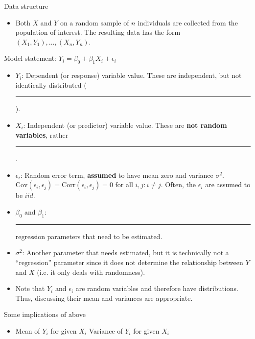 \documentclass{article}
\newcommand{\blankul}[1]{\rule[-1.5mm]{#1}{0.15mm}}	%
\begin{document}
\newpage

Data structure\bigskip
\begin{itemize}
    \item Both $X$ and $Y$ on a random sample of $n$ individuals are collected from the population of interest. The resulting data has the form $(X_1, Y_1), \ldots, (X_n, Y_n)$.
\end{itemize}\bigskip

Model statement: $Y_i = \beta_0 + \beta_1 X_i + \epsilon_i$\bigskip
\begin{itemize}
    \item $Y_i$: Dependent (or response) variable value. These are independent, but not identically distributed (\blankul{5cm}).
    \item $X_i$: Independent (or predictor) variable value. These are \textbf{not random variables}, rather \blankul{4cm}.
    \item $\epsilon_i$: Random error term, \textbf{assumed} to have mean zero and variance $\sigma^2$. \\$\mathrm{Cov}(\epsilon_i, \epsilon_j) = \mathrm{Corr}(\epsilon_i, \epsilon_j) = 0$ for all $i,j : i \ne j$. Often, the $\epsilon_i$ are assumed to be $iid$.
    \item $\beta_0$ and $\beta_1$: \blankul{5cm} regression parameters that need to be estimated.
    \item $\sigma^2$: Another parameter that needs estimated, but it is technically not a ``regression'' parameter since it does not determine the relationship between $Y$ and $X$ (i.e. it only deals with randomness).
    \item Note that $Y_i$ and $\epsilon_i$ are random variables and therefore have distributions. Thus, discussing their mean and variances are appropriate.
\end{itemize}\bigskip

Some implications of above\bigskip
\begin{itemize}
    \item Mean of $Y_i$ for given $X_i$ \hfill Variance of $Y_i$ for given $X_i$\vspace{50pt}
\end{itemize}\bigskip
\end{document}
